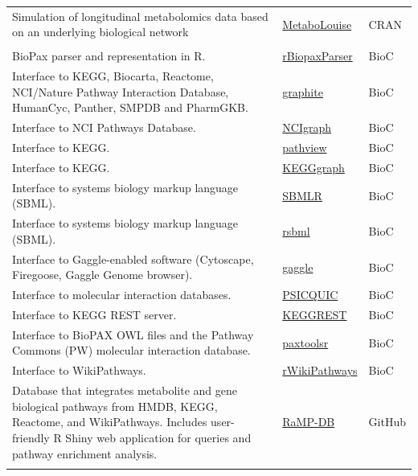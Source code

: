 \documentclass[]{article}
\begin{document}
\begin{longtable}[t]{>{\raggedright\arraybackslash}p{30em}>{\raggedright\arraybackslash}p{10em}>{\raggedright\arraybackslash}p{3em}}
Simulation of longitudinal metabolomics data based on an underlying biological network & \href{https://cran.r-project.org/package=MetaboLouise}{MetaboLouise} & CRAN\\
\rowcolor{gray!6}  \addlinespace[0.3em]
\multicolumn{3}{l}{\textbf{Pathway resources and interfaces}}\\
BioPax parser and representation in R. & \href{https://www.bioconductor.org/packages/release/bioc/html/rBiopaxParser.html}{rBiopaxParser} & BioC\\
Interface to KEGG, Biocarta, Reactome, NCI/Nature Pathway Interaction Database, HumanCyc, Panther, SMPDB and PharmGKB. & \href{http://bioconductor.org/packages/release/bioc/html/graphite.html}{graphite} & BioC\\
\rowcolor{gray!6}  Interface to NCI Pathways Database. & \href{https://www.bioconductor.org/packages/release/bioc/html/NCIgraph.html}{NCIgraph} & BioC\\
Interface to KEGG. & \href{https://bioconductor.org/packages/release/bioc/html/pathview.html}{pathview} & BioC\\
\rowcolor{gray!6}  Interface to KEGG. & \href{https://www.bioconductor.org/packages/release/bioc/html/KEGGgraph.html}{KEGGgraph} & BioC\\
Interface to systems biology markup language (SBML). & \href{https://www.bioconductor.org/packages/release/bioc/html/SBMLR.html}{SBMLR} & BioC\\
\rowcolor{gray!6}  Interface to systems biology markup language (SBML). & \href{https://bioconductor.org/packages/release/bioc/html/rsbml.html}{rsbml} & BioC\\
Interface to Gaggle-enabled software (Cytoscape, Firegoose, Gaggle Genome browser). & \href{https://bioconductor.org/packages/release/bioc/html/gaggle.html}{gaggle} & BioC\\
\rowcolor{gray!6}  Interface to molecular interaction databases. & \href{https://www.bioconductor.org/packages/release/bioc/html/PSICQUIC.html}{PSICQUIC} & BioC\\
Interface to KEGG REST server. & \href{http://bioconductor.org/packages/release/bioc/html/KEGGREST.html}{KEGGREST} & BioC\\
\rowcolor{gray!6}  Interface to BioPAX OWL files and the Pathway Commons (PW) molecular interaction database. & \href{http://bioconductor.org/packages/release/bioc/html/paxtoolsr.html}{paxtoolsr} & BioC\\
Interface to WikiPathways. & \href{https://bioconductor.org/packages/release/bioc/html/rWikiPathways.html}{rWikiPathways} & BioC\\
\rowcolor{gray!6}  Database that integrates metabolite and gene biological pathways from HMDB, KEGG, Reactome, and WikiPathways. Includes user-friendly R Shiny web application for queries and pathway enrichment analysis. & \href{https://github.com/Mathelab/RaMP-DB/}{RaMP-DB} & GitHub\\*
\end{longtable}
\end{document}
